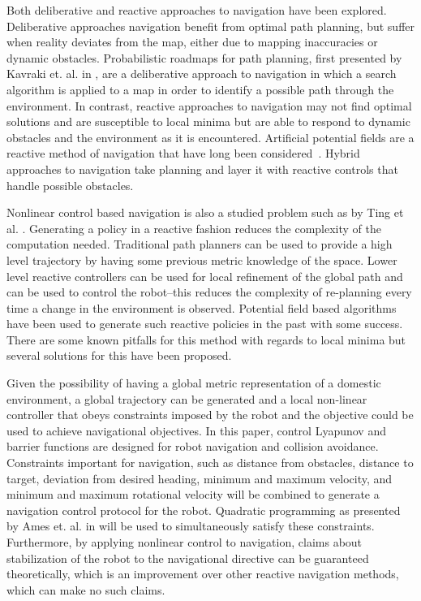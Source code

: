 \documentclass[journal]{IEEEtran}
\begin{document}
Both deliberative and reactive approaches to navigation have been explored. Deliberative approaches navigation benefit from optimal path planning, but suffer when reality deviates from the map, either due to mapping inaccuracies or dynamic obstacles. Probabilistic roadmaps for path planning, first presented by Kavraki et. al. in \cite{kavraki1996}, are a deliberative approach to navigation in which a search algorithm is applied to a map in order to identify a possible path through the environment. In contrast, reactive approaches to navigation may not find optimal solutions and are susceptible to local minima but are able to respond to dynamic obstacles and the environment as it is encountered. Artificial potential fields are a reactive method of navigation that have long been considered~\cite{khatib1985}. Hybrid approaches to navigation take planning and layer it with reactive controls that handle possible obstacles.

Nonlinear control based navigation is also a studied problem such as by Ting et al. \cite{ting2014reactive}. Generating a policy in a reactive fashion reduces the complexity of the computation needed. Traditional path planners can be used to provide a high level trajectory by having some previous metric knowledge of the space. Lower level reactive controllers can be used for local refinement of the global path and can be used to control the robot--this reduces the complexity of re-planning every time a change in the environment is observed. Potential field based algorithms have been used to generate such reactive policies in the past with some success. There are some known pitfalls for this method with regards to local minima but several solutions for this have been proposed.

Given the possibility of having a global metric representation of a domestic environment, a global trajectory can be generated and a local non-linear controller that obeys constraints imposed by the robot and the objective could be used to achieve navigational objectives. In this paper, control Lyapunov and barrier functions are designed for robot navigation and collision avoidance. Constraints important for navigation, such as distance from obstacles, distance to target, deviation from desired heading, minimum and maximum velocity, and minimum and maximum rotational velocity will be combined to generate a navigation control protocol for the robot. Quadratic programming as presented by Ames et. al. in \cite{amesACC} will be used to simultaneously satisfy these constraints. Furthermore, by applying nonlinear control to navigation, claims about stabilization of the robot to the navigational directive can be guaranteed theoretically, which is an improvement over other reactive navigation methods, which can make no such claims.
\end{document}
